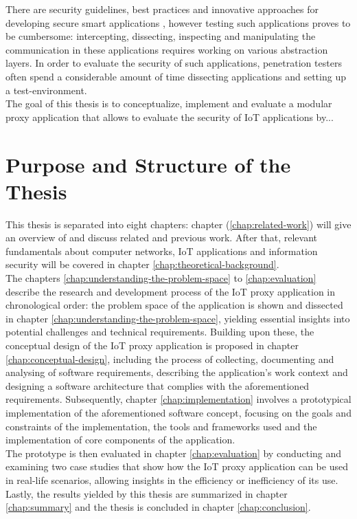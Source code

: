 There are security guidelines, best practices and innovative approaches for developing secure smart applications \cite[p.~120]{Jäger_Schöllhammer_Lickefett_Bauernhansl_2016}\cite[p.326-328]{Lesjak2016}, however testing such applications proves to be cumbersome: %
intercepting, dissecting, inspecting and manipulating the communication in these applications requires working on various abstraction layers. In order to evaluate the security of such applications, penetration testers often spend a considerable amount of time dissecting applications and setting up a test-environment.\\
The goal of this thesis is to conceptualize, implement and evaluate a modular proxy application that allows to evaluate the security of \ac{IoT} applications by... %

\section{Purpose and Structure of the Thesis}
This thesis is separated into eight chapters: chapter (\ref{chap:related-work}) will give an overview of and discuss related and previous work. After that, relevant fundamentals about computer networks, \ac{IoT} applications and information security will be covered in chapter \ref{chap:theoretical-background}.\\
The chapters \ref{chap:understanding-the-problem-space} to \ref{chap:evaluation} describe the research and development process of the \ac{IoT} proxy application in chronological order: the problem space of the application is shown and dissected in chapter \ref{chap:understanding-the-problem-space}, yielding essential insights into potential challenges and technical requirements. Building upon these, the conceptual design of the \ac{IoT} proxy application is proposed in chapter \ref{chap:conceptual-design}, including the process of collecting, documenting and analysing of software requirements, describing the application's work context and designing a software architecture that complies with the aforementioned requirements. Subsequently, chapter \ref{chap:implementation} involves a prototypical implementation of the aforementioned software concept, focusing on the goals and constraints of the implementation, the tools and frameworks used and the implementation of core components of the application.\\
The prototype is then evaluated in chapter \ref{chap:evaluation} by conducting and examining two case studies that show how the \ac{IoT} proxy application can be used in real-life scenarios, allowing insights in the efficiency or inefficiency of its use. Lastly, the results yielded by this thesis are summarized in chapter \ref{chap:summary} and the thesis is concluded in chapter \ref{chap:conclusion}. 


